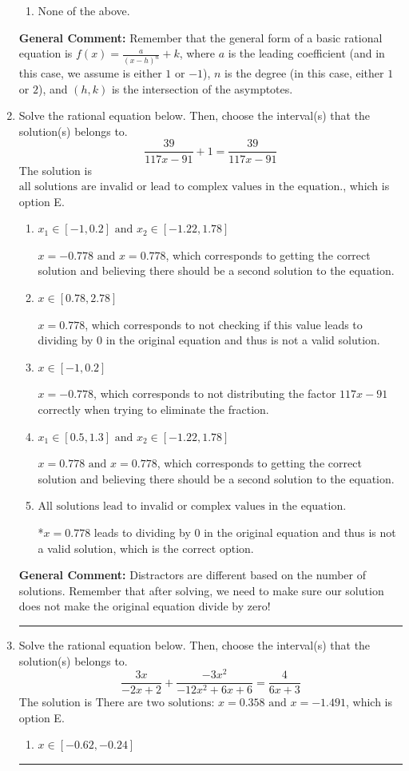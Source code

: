 \documentclass{extbook}[14pt]
\newcommand{\litem}[1]{\item #1

\rule{\textwidth}{0.4pt}}
\begin{document}
\begin{enumerate}
{\begin{enumerate}[label=\Alph*.]
\begin{multicols}{2}
\end{multicols}\item None of the above.\end{enumerate}
\textbf{General Comment:} Remember that the general form of a basic rational equation is $ f(x) = \frac{a}{(x-h)^n} + k$, where $a$ is the leading coefficient (and in this case, we assume is either $1$ or $-1$), $n$ is the degree (in this case, either $1$ or $2$), and $(h, k)$ is the intersection of the asymptotes.
}
\litem{
Solve the rational equation below. Then, choose the interval(s) that the solution(s) belongs to.
\[ \frac{39}{117x -91} + 1 = \frac{39}{117x -91} \]
The solution is \( \text{all solutions are invalid or lead to complex values in the equation.} \), which is option E.\begin{enumerate}[label=\Alph*.]
\item \( x_1 \in [-1, 0.2] \text{ and } x_2 \in [-1.22,1.78] \)

$x = -0.778 \text{ and } x = 0.778$, which corresponds to getting the correct solution and believing there should be a second solution to the equation.
\item \( x \in [0.78,2.78] \)

$x = 0.778$, which corresponds to not checking if this value leads to dividing by 0 in the original equation and thus is not a valid solution.
\item \( x \in [-1,0.2] \)

$x = -0.778$, which corresponds to not distributing the factor $117x -91$ correctly when trying to eliminate the fraction.
\item \( x_1 \in [0.5, 1.3] \text{ and } x_2 \in [-1.22,1.78] \)

$x = 0.778 \text{ and } x = 0.778$, which corresponds to getting the correct solution and believing there should be a second solution to the equation.
\item \( \text{All solutions lead to invalid or complex values in the equation.} \)

*$x = 0.778$ leads to dividing by 0 in the original equation and thus is not a valid solution, which is the correct option.
\end{enumerate}

\textbf{General Comment:} Distractors are different based on the number of solutions. Remember that after solving, we need to make sure our solution does not make the original equation divide by zero!
}
\litem{
Solve the rational equation below. Then, choose the interval(s) that the solution(s) belongs to.
\[ \frac{3x}{-2x + 2} + \frac{-3x^{2}}{-12x^{2} +6 x + 6} = \frac{4}{6x + 3} \]
The solution is \( \text{There are two solutions: } x = 0.358 \text{ and } x = -1.491 \), which is option E.\begin{enumerate}[label=\Alph*.]
\item \( x \in [-0.62,-0.24] \)



\end{enumerate}}
\end{enumerate}
\end{document}
